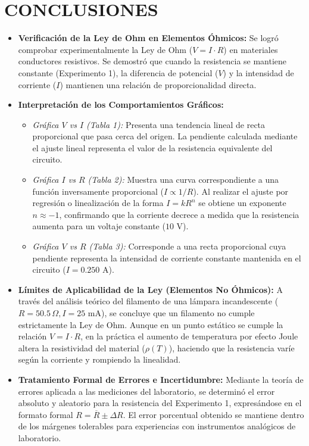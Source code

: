 \documentclass[12pt,a4paper]{article}
\begin{document}
\section{CONCLUSIONES}
\begin{itemize}
    \item \textbf{Verificación de la Ley de Ohm en Elementos Óhmicos:} Se logró comprobar experimentalmente la Ley de Ohm ($V = I \cdot R$) en materiales conductores resistivos. Se demostró que cuando la resistencia se mantiene constante (Experimento 1), la diferencia de potencial ($V$) y la intensidad de corriente ($I$) mantienen una relación de proporcionalidad directa.
    \item \textbf{Interpretación de los Comportamientos Gráficos:}
    \begin{itemize}
        \item \textit{Gráfica $V$ vs $I$ (Tabla 1):} Presenta una tendencia lineal de recta proporcional que pasa cerca del origen. La pendiente calculada mediante el ajuste lineal representa el valor de la resistencia equivalente del circuito.
        \item \textit{Gráfica $I$ vs $R$ (Tabla 2):} Muestra una curva correspondiente a una función inversamente proporcional ($I \propto 1/R$). Al realizar el ajuste por regresión o linealización de la forma $I = k R^n$ se obtiene un exponente $n \approx -1$, confirmando que la corriente decrece a medida que la resistencia aumenta para un voltaje constante ($10\text{ V}$).
        \item \textit{Gráfica $V$ vs $R$ (Tabla 3):} Corresponde a una recta proporcional cuya pendiente representa la intensidad de corriente constante mantenida en el circuito ($I = 0.250\text{ A}$).
    \end{itemize}
    \item \textbf{Límites de Aplicabilidad de la Ley (Elementos No Óhmicos):} A través del análisis teórico del filamento de una lámpara incandescente ($R = 50.5\,\Omega, I = 25\text{ mA}$), se concluye que un filamento no cumple estrictamente la Ley de Ohm. Aunque en un punto estático se cumple la relación $V = I \cdot R$, en la práctica el aumento de temperatura por efecto Joule altera la resistividad del material ($\rho(T)$), haciendo que la resistencia varíe según la corriente y rompiendo la linealidad.
    \item \textbf{Tratamiento Formal de Errores e Incertidumbre:} Mediante la teoría de errores aplicada a las mediciones del laboratorio, se determinó el error absoluto y aleatorio para la resistencia del Experimento 1, expresándose en el formato formal $R = \overline{R} \pm \Delta R$. El error porcentual obtenido se mantiene dentro de los márgenes tolerables para experiencias con instrumentos analógicos de laboratorio.
\end{itemize}
\end{document}

